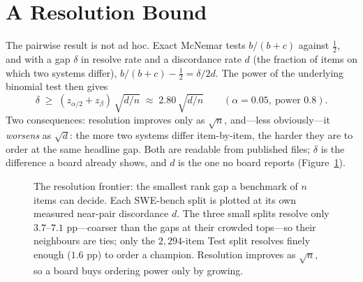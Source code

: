 \documentclass[11pt]{article}
\begin{document}
\section{A Resolution Bound}
\label{sec:law}
The pairwise result is not ad hoc. Exact McNemar tests $b/(b+c)$ against $\tfrac12$, and with a gap
$\delta$ in resolve rate and a discordance rate $d$ (the fraction of items on which two systems
differ), $b/(b+c)-\tfrac12 = \delta/2d$. The power of the underlying binomial test then gives
\begin{equation}
\delta \;\ge\; (z_{\alpha/2}+z_{\beta})\,\sqrt{d/n} \;\approx\; 2.80\,\sqrt{d/n}
\qquad (\alpha=0.05,\ \text{power }0.8).
\label{eq:law}
\end{equation}
Two consequences: resolution improves only as $\sqrt{n}$, and---less obviously---it \emph{worsens} as
$\sqrt{d}$: the more two systems differ item-by-item, the harder they are to order at the same
headline gap. Both are readable from published files; $\delta$ is the difference a board already shows, and $d$ is the one no board reports
(Figure~\ref{fig:frontier}).

\begin{figure}[t]
\centering
{}
\caption{The resolution frontier: the smallest rank gap a benchmark of $n$ items can decide. Each
SWE-bench split is plotted at its own measured near-pair discordance $d$. The three small splits
resolve only $3.7$--$7.1$ pp---coarser than the gaps at their crowded tops---so their neighbours are
ties; only the $2{,}294$-item Test split resolves finely enough ($1.6$ pp) to order a champion.
Resolution improves as $\sqrt{n}$, so a board buys ordering power only by growing.}
\label{fig:frontier}
\end{figure}
\end{document}
